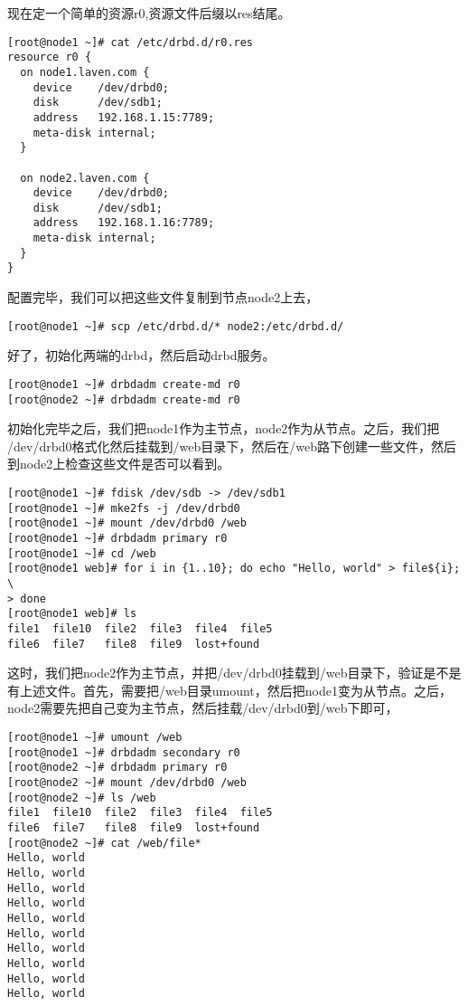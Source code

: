 现在定一个简单的资源r0,资源文件后缀以res结尾。

\small{
\begin{verbatim}
[root@node1 ~]# cat /etc/drbd.d/r0.res 
resource r0 {
  on node1.laven.com {
    device    /dev/drbd0;
    disk      /dev/sdb1;
    address   192.168.1.15:7789;
    meta-disk internal;
  }

  on node2.laven.com {
    device    /dev/drbd0;
    disk      /dev/sdb1;
    address   192.168.1.16:7789;
    meta-disk internal;
  }
}
\end{verbatim}
}
\normalsize

配置完毕，我们可以把这些文件复制到节点node2上去，

\small{
\begin{verbatim}
[root@node1 ~]# scp /etc/drbd.d/* node2:/etc/drbd.d/
\end{verbatim}
}
\normalsize

好了，初始化两端的drbd，然后启动drbd服务。

\small{
\begin{verbatim}
[root@node1 ~]# drbdadm create-md r0
[root@node2 ~]# drbdadm create-md r0
\end{verbatim}
}
\normalsize

初始化完毕之后，我们把node1作为主节点，node2作为从节点。之后，我们把
/dev/drbd0格式化然后挂载到/web目录下，然后在/web路下创建一些文件，然后
到node2上检查这些文件是否可以看到。

\small{
\begin{verbatim}
[root@node1 ~]# fdisk /dev/sdb -> /dev/sdb1
[root@node1 ~]# mke2fs -j /dev/drbd0
[root@node1 ~]# mount /dev/drbd0 /web
[root@node1 ~]# drbdadm primary r0
[root@node1 ~]# cd /web
[root@node1 web]# for i in {1..10}; do echo "Hello, world" > file${i}; \
> done
[root@node1 web]# ls
file1  file10  file2  file3  file4  file5  
file6  file7   file8  file9  lost+found
\end{verbatim}
}
\normalsize

这时，我们把node2作为主节点，并把/dev/drbd0挂载到/web目录下，验证是不是
有上述文件。首先，需要把/web目录umount，然后把node1变为从节点。之后，
node2需要先把自己变为主节点，然后挂载/dev/drbd0到/web下即可，

\small{
\begin{verbatim}
[root@node1 ~]# umount /web
[root@node1 ~]# drbdadm secondary r0
[root@node2 ~]# drbdadm primary r0
[root@node2 ~]# mount /dev/drbd0 /web
[root@node2 ~]# ls /web
file1  file10  file2  file3  file4  file5  
file6  file7   file8  file9  lost+found
[root@node2 ~]# cat /web/file*
Hello, world
Hello, world
Hello, world
Hello, world
Hello, world
Hello, world
Hello, world
Hello, world
Hello, world
Hello, world
\end{verbatim}
}
\normalsize